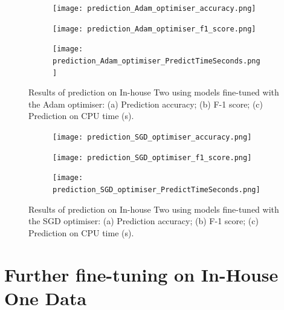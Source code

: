 \documentclass[a4paper,12pt]{article}
\newcommand{\figwidthh}{0.48\textwidth}
\begin{document}
\begin{figure}[p] 
	\begin{center}
		\begin{subfigure}[b]{\figwidthh}
			\caption{} 
			\texttt{[image: prediction\_Adam\_optimiser\_accuracy.png]}
		\end{subfigure}
        \hfill
		\begin{subfigure}[b]{\figwidthh}
			\caption{}
			\texttt{[image: prediction\_Adam\_optimiser\_f1\_score.png]}
		\end{subfigure}
        \hfill
		\begin{subfigure}[b]{\figwidthh}
			\caption{}
			\texttt{[image: prediction\_Adam\_optimiser\_PredictTimeSeconds.png]}
		\end{subfigure}
	\end{center}
	\caption{Results of prediction on In-house Two using models fine-tuned with the Adam optimiser: 
	(a) Prediction accuracy; (b) F-1 score; (c) Prediction on CPU time (s).
	} 
	\label{fig:res_prdict_adam}
\end{figure}


\begin{figure}[p] 
	\begin{center}
		\begin{subfigure}[b]{\figwidthh}
			\caption{} 
			\texttt{[image: prediction\_SGD\_optimiser\_accuracy.png]}
		\end{subfigure}
        \hfill
		\begin{subfigure}[b]{\figwidthh}
			\caption{}
			\texttt{[image: prediction\_SGD\_optimiser\_f1\_score.png]}
		\end{subfigure}
        \hfill
		\begin{subfigure}[b]{\figwidthh}
			\caption{}
			\texttt{[image: prediction\_SGD\_optimiser\_PredictTimeSeconds.png]}
		\end{subfigure}
	\end{center}
	\caption{Results of prediction on In-house Two using models fine-tuned with the SGD optimiser: 
	(a) Prediction accuracy; (b) F-1 score; (c) Prediction on CPU time (s).
	} 
	\label{fig:res_predict_SGD}
\end{figure}

\newpage



\section{Further fine-tuning on In-House One Data}
\end{document}
